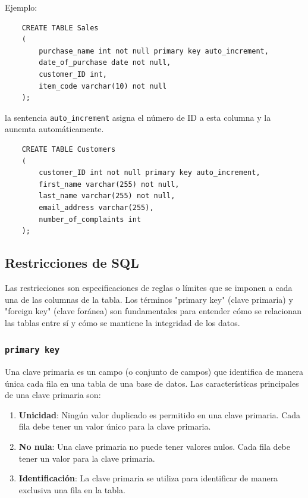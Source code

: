    
    Ejemplo:
    
    \begin{verbatim}
    CREATE TABLE Sales
    (
        purchase_name int not null primary key auto_increment,
        date_of_purchase date not null,
        customer_ID int,
        item_code varchar(10) not null
    );
    \end{verbatim}
    
    la sentencia \texttt{auto\_increment} asigna el número de ID a esta columna y la aunemta automáticamente. \\

    \begin{verbatim}
    CREATE TABLE Customers
    (
        customer_ID int not null primary key auto_increment,
        first_name varchar(255) not null,
        last_name varchar(255) not null,
        email_address varchar(255),
        number_of_complaints int
    );
    \end{verbatim}



    \subsection{Restricciones de SQL}

    Las restricciones son especificaciones de reglas o límites que se imponen a cada una de las columnas de la tabla. Los términos "primary key" (clave primaria) y "foreign key" (clave foránea) son fundamentales para entender cómo se relacionan las tablas entre sí y cómo se mantiene la integridad de los datos.

    \subsubsection{\texttt{primary key}}

    Una clave primaria es un campo (o conjunto de campos) que identifica de manera única cada fila en una tabla de una base de datos. Las características principales de una clave primaria son:

    \begin{enumerate}
        \item \textbf{Unicidad}: Ningún valor duplicado es permitido en una clave primaria. Cada fila debe tener un valor único para la clave primaria.
        \item \textbf{No nula}: Una clave primaria no puede tener valores nulos. Cada fila debe tener un valor para la clave primaria.
        \item \textbf{Identificación}: La clave primaria se utiliza para identificar de manera exclusiva una fila en la tabla.

    

    
    \end{enumerate}
    
